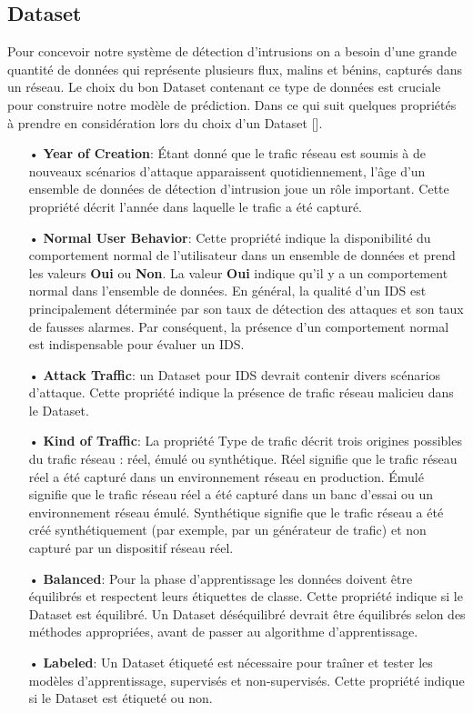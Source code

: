 \subsection{Dataset}
Pour concevoir notre système de détection d'intrusions on a besoin d'une grande quantité de données qui représente plusieurs flux, malins et bénins, capturés dans un réseau. Le choix du bon Dataset contenant ce type de données est cruciale pour construire notre modèle de prédiction. Dans ce qui suit quelques propriétés à prendre en considération lors du choix d'un Dataset [\cite{12}].\\
\begin{itemize}
\item[•]\textbf{Year of Creation}: Étant donné que le trafic réseau est soumis à de nouveaux scénarios d’attaque apparaissent quotidiennement, l’âge d’un ensemble de données de détection d’intrusion joue un rôle important. Cette propriété décrit l’année dans laquelle le trafic a été capturé.\\
\item[•]\textbf{Normal User Behavior}: Cette propriété indique la disponibilité du comportement normal de l’utilisateur dans un ensemble de données et prend les valeurs \textbf{Oui} ou \textbf{Non}. La valeur \textbf{Oui} indique qu’il y a un comportement normal dans l’ensemble de données. En général, la qualité d’un IDS est principalement déterminée par son taux de détection des attaques et son taux de fausses alarmes. Par conséquent, la présence d’un comportement normal est indispensable pour évaluer un IDS.\\
\item[•]\textbf{Attack Traffic}: un Dataset pour IDS devrait contenir divers scénarios d’attaque. Cette propriété indique la présence de trafic réseau malicieu dans le Dataset.\\
\item[•]\textbf{Kind of Traffic}: La propriété Type de trafic décrit trois origines possibles du trafic réseau : réel, émulé ou synthétique. Réel signifie que le trafic réseau réel a été capturé dans
un environnement réseau en production. Émulé signifie que le trafic réseau réel a été capturé dans un banc d’essai ou un environnement réseau émulé. Synthétique signifie que le trafic réseau a été créé synthétiquement (par exemple, par un générateur de trafic) et non capturé par un dispositif réseau réel.\\
\item[•]\textbf{Balanced}: Pour la phase d'apprentissage les données doivent être équilibrés et respectent  leurs étiquettes de classe. Cette propriété indique si le Dataset est équilibré. Un Dataset déséquilibré devrait être équilibrés selon des méthodes appropriées, avant de passer au algorithme d'apprentissage.\\
\item[•]\textbf{Labeled}: Un Dataset étiqueté est nécessaire pour traîner et tester les modèles d’apprentissage, supervisés et non-supervisés. Cette propriété indique si le Dataset est étiqueté ou non. 
\end{itemize}

